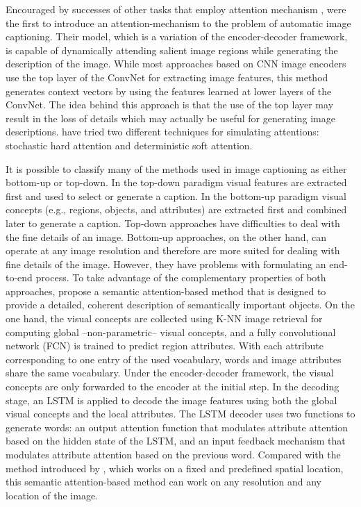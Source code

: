 Encouraged by successes of other tasks that employ attention mechanism \citet{Mnih2014, LeiBa2015}, \citet{Xu2015} were the first to introduce an attention-mechanism to the problem of automatic image captioning. Their model, which is a variation of the encoder-decoder framework, is capable of dynamically attending salient image regions while generating the description of the image. While most approaches based on CNN image encoders use the top layer of the ConvNet for extracting image features, this method generates context vectors by using the features learned at lower layers of the ConvNet. The idea behind this approach is that the use of the top layer may result in the loss of details which may actually be useful for generating image descriptions. \citeauthor{Xu2015} have tried two different techniques for simulating attentions: stochastic hard attention and deterministic soft attention.

It is possible to classify many of the methods used in image captioning as either bottom-up or top-down. In the top-down paradigm \citep{Donahue2015, Karpathy2015, Chen2015, Mao2015_mRNN, Mao2015_Child, Vinyals2015, Xu2015} visual features are extracted first and used to select or generate a caption. In the bottom-up paradigm \citep{Farhadi2010, Kulkarni2011, Li2011, Kuznetsova2012, Elliott2013, Lebret2015a} visual concepts (e.g., regions, objects, and attributes) are extracted first and combined later to generate a caption. Top-down approaches have difficulties to deal with the fine details of an image. Bottom-up approaches, on the other hand, can operate at any image resolution and therefore are more suited for dealing with fine details of the image. However, they have problems with formulating an end-to-end process. To take advantage of the complementary properties of both approaches, \citet{You2016} propose a semantic attention-based method that is designed to provide a detailed, coherent description of semantically important objects. On the one hand, the visual concepts are collected using K-NN image retrieval for computing global --non-parametric-- visual concepts, and a fully convolutional network (FCN) \citep{Long2015} is trained to predict region attributes. With each attribute corresponding to one entry of the used vocabulary, words and image attributes share the same vocabulary. Under the encoder-decoder framework, the visual concepts are only forwarded to the encoder at the initial step. In the decoding stage, an LSTM is applied to decode the image features using both the global visual concepts and the local attributes. The LSTM decoder uses two functions to generate words: an output attention function that modulates attribute attention based on the hidden state of the LSTM, and an input feedback mechanism that modulates attribute attention based on the previous word. Compared with the method introduced by \citet{Xu2015}, which works on a fixed and predefined spatial location, this semantic attention-based method can work on any resolution and any location of the image.

